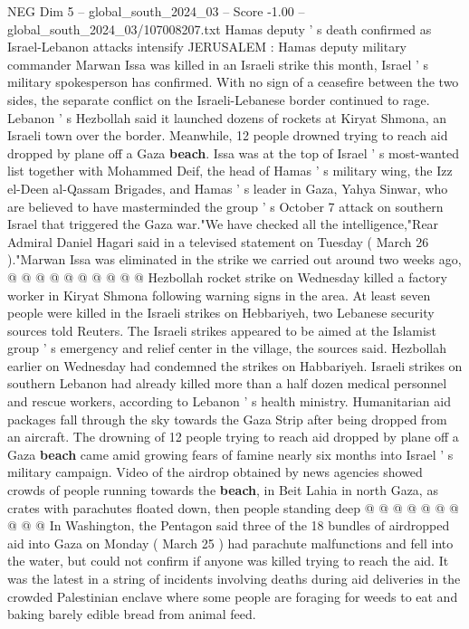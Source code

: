 \begin{textsample}{NEG Dim 5 – global\_south\_2024\_03 – Score -1.00 – global\_south\_2024\_03/107008207.txt}  \label{ex:f5_neg_311}
Hamas deputy ' s death confirmed as Israel-Lebanon attacks intensify JERUSALEM : Hamas deputy military commander Marwan Issa was killed in an Israeli strike this month, Israel ' s military spokesperson has confirmed.
With no sign of a ceasefire between the two sides, the separate conflict on the Israeli-Lebanese border continued to rage.
Lebanon ' s Hezbollah said it launched dozens of rockets at Kiryat Shmona, an Israeli town over the border.
Meanwhile, 12 people drowned trying to reach aid dropped by plane off a Gaza \textbf{beach}.
Issa was at the top of Israel ' s most-wanted list together with Mohammed Deif, the head of Hamas ' s military wing, the Izz el-Deen al-Qassam Brigades, and Hamas ' s leader in Gaza, Yahya Sinwar, who are believed to have masterminded the group ' s October 7 attack on southern Israel that triggered the Gaza war."We have checked all the intelligence,"Rear Admiral Daniel Hagari said in a televised statement on Tuesday ( March 26 )."Marwan Issa was eliminated in the strike we carried out around two weeks ago, @ @ @ @ @ @ @ @ @ @ Hezbollah rocket strike on Wednesday killed a factory worker in Kiryat Shmona following warning signs in the area.
At least seven people were killed in the Israeli strikes on Hebbariyeh, two Lebanese security sources told Reuters.
The Israeli strikes appeared to be aimed at the Islamist group ' s emergency and relief center in the village, the sources said.
Hezbollah earlier on Wednesday had condemned the strikes on Habbariyeh.
Israeli strikes on southern Lebanon had already killed more than a half dozen medical personnel and rescue workers, according to Lebanon ' s health ministry.
Humanitarian aid packages fall through the sky towards the Gaza Strip after being dropped from an aircraft.
The drowning of 12 people trying to reach aid dropped by plane off a Gaza \textbf{beach} came amid growing fears of famine nearly six months into Israel ' s military campaign.
Video of the airdrop obtained by news agencies showed crowds of people running towards the \textbf{beach}, in Beit Lahia in north Gaza, as crates with parachutes floated down, then people standing deep @ @ @ @ @ @ @ @ @ @ In Washington, the Pentagon said three of the 18 bundles of airdropped aid into Gaza on Monday ( March 25 ) had parachute malfunctions and fell into the water, but could not confirm if anyone was killed trying to reach the aid.
It was the latest in a string of incidents involving deaths during aid deliveries in the crowded Palestinian enclave where some people are foraging for weeds to eat and baking barely edible bread from animal feed.

\end{textsample}
